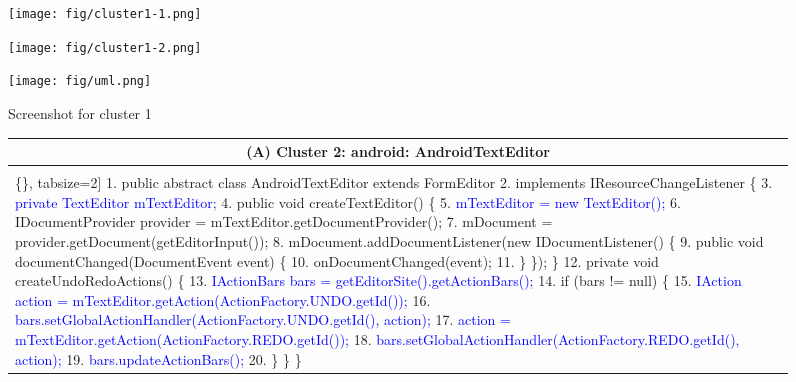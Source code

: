 \begin{figure*}[!htb]
    \begin{minipage}{0.5\textwidth}
    \centering
\texttt{[image: fig/cluster1-1.png]}
 \end{minipage}%
  \hfill
     \begin{minipage}{0.5\textwidth}
     \centering
 \texttt{[image: fig/cluster1-2.png]}
  \end{minipage}
      \begin{minipage}{0.5\textwidth}
     \centering
 \texttt{[image: fig/uml.png]}
  \end{minipage}
   \caption{Screenshot for cluster 1}
 \label{fig:nameFix}
   \end{figure*}


\begin{figure*}[!htb]
 \begin{minipage}{0.5\textwidth}
\scriptsize 
\begin{tabular}{@{}p{}} 
 \hline 
  \multicolumn{1}{c}{(A) Cluster 2: android: AndroidTextEditor} \\ \hline
  \vspace{-4mm}
\begin{Verbatim}[commandchars=\\\{\}, tabsize=2]
1. public abstract class AndroidTextEditor extends FormEditor
2.    implements IResourceChangeListener \{
3. \textcolor{blue}{   private TextEditor mTextEditor;}
4.  public void createTextEditor() \{
5. \textcolor{blue}{   mTextEditor = new TextEditor();}
6.    IDocumentProvider provider = mTextEditor.getDocumentProvider();
7.    mDocument = provider.getDocument(getEditorInput());
8.    mDocument.addDocumentListener(new IDocumentListener() \{
9.      public void documentChanged(DocumentEvent event) \{
10.        onDocumentChanged(event);
11.      \}  \});  \}
12. private void createUndoRedoActions() \{
13.\textcolor{blue}{ IActionBars bars = getEditorSite().getActionBars();}
14.  if (bars != null) \{
15.\textcolor{blue}{  IAction action = mTextEditor.getAction(ActionFactory.UNDO.getId());}
16.\textcolor{blue}{  bars.setGlobalActionHandler(ActionFactory.UNDO.getId(), action);}
17.\textcolor{blue}{  action = mTextEditor.getAction(ActionFactory.REDO.getId());}
18.\textcolor{blue}{  bars.setGlobalActionHandler(ActionFactory.REDO.getId(), action);}
19.\textcolor{blue}{  bars.updateActionBars();}
20.        \}  \}    \} 
  \end{Verbatim}
      \vspace{-4mm}

\end{tabular}
\end{minipage}
\end{figure*}
